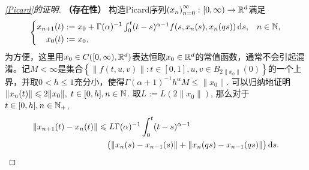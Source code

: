 \begin{proof}[\cref{Picard}的证明]
    \textbf{（存在性）} 构造Picard序列$\left(x_n\right)_{n=0}^\infty\colon [0,\infty)\to \mathbb{R}^d$满足
    \begin{equation*}
        \left\{\begin{aligned}
            x_{n+1}(t)&:=x_0 + \Gamma(\alpha)^{-1} \textstyle\int_0^t (t-s)^{\alpha-1} f(s,x_n(s),x_n(qs))\mathop{}\!\mathrm{d} s, & n\in \mathbb{N},\\
            x_0(t)&:=x_0, & {}
        \end{aligned}\right.
    \end{equation*}
    为方便，这里用$x_0\in C([0,\infty),\mathbb{R}^d)$表达恒取$x_0\in\mathbb{R}^d$的常值函数，通常不会引起混淆。记$M<\infty$是集合$\left\{\left\|f(t,u,v)\right\|\colon t\in [0,1], u,v\in B_{2\|x_0\|}(0)\right\}$的一个上界，并取$0<h\leqslant 1$充分小，使得$\Gamma(\alpha + 1)^{-1} h^\alpha M \leqslant \|x_0\|$. 可以归纳地证明$\left\|x_{n}(t)\right\|\leqslant 2\|x_0\|,\;t\in [0,h],n\in \mathbb{N}$. 取$L:=L(2\|x_0\|)$, 那么对于$t\in [0,h],n\in \mathbb{N_+}$,
    \begin{equation}\label{Picard估计递归}
        \begin{aligned}
            \left\| x_{n+1}(t)-x_n(t) \right\|&\leqslant L\Gamma(\alpha)^{-1}\int_0^t (t-s)^{\alpha-1} \\ &\relphantom{\leqslant}\bigl(\left\|x_n(s)-x_{n-1}(s)\right\| + \left\|x_n(qs)-x_{n-1}(qs)\right\|\bigr) \differential s.
        \end{aligned}
    \end{equation}


\end{proof}
